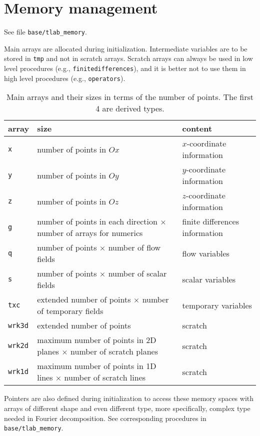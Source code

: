 \chapter{Memory management}

See file \texttt{base/tlab\_memory}.

Main arrays are allocated during initialization. Intermediate variables are to be stored in \texttt{tmp} and not in scratch arrays. Scratch arrays can always be used in low level procedures (e.g., \texttt{finitedifferences}), and it is better not to use them in high level procedures (e.g., \texttt{operators}).

\begin{table}[!h]
    \footnotesize
    \renewcommand{\arraystretch}{1.2}
    \centering
    \begin{tabular}{lll}
        \hline
        array & size & content \\
        \hline
        \texttt{x}      & number of points in $Ox$  & $x$-coordinate information        \\
        \texttt{y}      & number of points in $Oy$  & $y$-coordinate information        \\
        \texttt{z}      & number of points in $Oz$  & $z$-coordinate information        \\
        \texttt{g}      & number of points in each direction $\times$ number of arrays for numerics           &  finite differences information        \\
        \texttt{q}      & number of points $\times$ number of flow fields                           & flow variables        \\
        \texttt{s}      & number of points $\times$ number of scalar fields                         & scalar variables      \\
        \texttt{txc}    & extended number of points $\times$ number of temporary fields             & temporary variables   \\
        \texttt{wrk3d}  & extended number of points                                                 & scratch               \\
        \texttt{wrk2d}  & maximum number of points in 2D planes $\times$ number of scratch planes   & scratch               \\
        \texttt{wrk1d}  & maximum number of points in 1D lines $\times$ number of scratch lines     & scratch               \\
        \hline
    \end{tabular}
    \caption{Main arrays and their sizes in terms of the number of points. The first 4 are derived types.}
\end{table}

Pointers are also defined during initialization to access these memory spaces with arrays of different shape and even different type, more specifically, complex type needed in Fourier decomposition. See corresponding procedures in \texttt{base/tlab\_memory}.